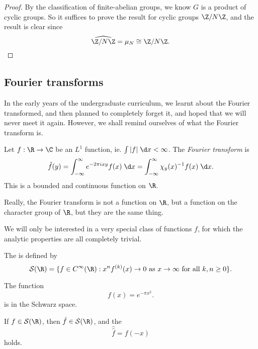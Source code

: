 \documentclass[a4paper]{article}
\begin{document}
\begin{proof}
  By the classification of finite-abelian groups, we know $G$ is a product of cyclic groups. So it suffices to prove the result for cyclic groups $\Z/N\Z$, and the result is clear since
  \[
    \widehat{\Z/N\Z} = \mu_N \cong \Z/N\Z.
  \]
\end{proof}

\subsection{Fourier transforms}
In the early years of the undergraduate curriculum, we learnt about the Fourier transformed, and then planned to completely forget it, and hoped that we will never meet it again. However, we shall remind ourselves of what the Fourier transform is.

\begin{defi}
  Let $f: \R \to \C$ be an $L^1$ function, ie. $\int |f| \;\d x < \infty$. The \emph{Fourier transform} is
  \[
    \hat{f}(y) = \int_{-\infty}^\infty e^{-2\pi i xy} f(x) \;\d x = \int_{-\infty}^\infty \chi_y(x)^{-1} f(x) \;\d x.
  \]
  This is a bounded and continuous function on $\R$.
\end{defi}
Really, the Fourier transform is not a function on $\R$, but a function on the character group of $\R$, but they are the same thing.

We will only be interested in a very special class of functions $f$, for which the analytic properties are all completely trivial.
\begin{defi}
  The  is defined by
  \[
    \mathcal{S}(\R) = \{f \in C^\infty(\R) : x^n f^{(k)}(x) \to 0\text{ as }x \to \infty\text{ for all }k, n\geq 0\}.
  \]
\end{defi}

\begin{eg}
  The function
  \[
    f(x) = e^{-\pi x^2}.
  \]
  is in the Schwarz space.
\end{eg}

\begin{prop}
  If $f \in \mathcal{S}(\R)$, then $\hat{f} \in \mathcal{S}(\R)$, and the 
  \[
    \hat{\hat{f}} = f(-x)
  \]
  holds.
\end{prop}
\end{document}
